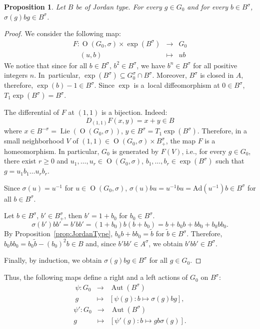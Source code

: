 \documentclass[a4paper,oneside,11pt]{amsart}
\DeclareMathOperator{\Aut}{Aut}
\DeclareMathOperator{\OO}{O}
\DeclareMathOperator{\Lie}{Lie}
\theoremstyle{plain}
\newtheorem{prop}[teo]{Proposition}
\theoremstyle{definition}
\theoremstyle{remark}
\begin{document}
\begin{prop}\label{prop:JordanType+}
Let $B$ be of Jordan type. For every $g\in G_0$ and for every $b\in B^{\sigma}$, $\sigma(g)bg\in B^{\sigma}$.
\end{prop}

\begin{proof}
We consider the following map:
$$\begin{array}{rcl}
F\colon \OO(G_0,\sigma)\times \exp(B^{\sigma}) & \to & G_0\\
\quad (u,b) & \mapsto & ub
\end{array} $$
We notice that since for all $b\in B^{\sigma}$, $b^2\in B^{\sigma}$, we have $b^n\in B^{\sigma}$ for all positive integers $n$. In~particular, $\exp(B^\sigma)\subseteq G^\sigma_0\cap B^\sigma$. Moreover, $B^{\sigma}$ is closed in $A$, therefore, $\exp(b)-1\in B^{\sigma}$. Since $\exp$ is a~local diffeomorphism at $0\in B^{\sigma}$, $T_1\exp(B^{\sigma})= B^{\sigma}$.

The differential of $F$ at $(1,1)$ is a bijection. Indeed:
$$D_{(1,1)}F(x,y)=x+y\in B$$
where $x\in B^{-\sigma}=\Lie(\OO(G_0,\sigma))$, $y\in B^{\sigma}=T_1\exp(B^{\sigma})$.
Therefore, in a small neighborhood $V$ of $(1,1)\in \OO(G_0,\sigma)\times B^{\sigma}_+$, the map $F$ is a homeomorphism. In particular, $G_0$ is generated by $F(V)$, i.e., for every $g\in G_0$, there exist $r\geq 0$ and $u_1,\dots,u_r\in \OO(G_0,\sigma)$, $b_1,\dots,b_r\in \exp(B^{\sigma})$ such that $g=u_1b_1\dots u_rb_r$.

Since $\sigma(u)=u^{-1}$ for $u\in \OO(G_0,\sigma)$, $\sigma(u)bu=u^{-1}bu=\mathrm{Ad}(u^{-1})b\in B^{\sigma}$ for all $b\in B^{\sigma}$.

Let $b\in B^{\sigma}$, $b'\in B^{\sigma}_+$, then $b'=1+b_0$ for $b_0\in B^{\sigma}$. $$\sigma(b')bb'=b'bb'=(1+b_0)b(b+b_0)=b+b_0b+bb_0+b_0bb_0.$$
By Proposition~\ref{prop:JordanType}, $b_0b+bb_0=\tilde b$ for $\tilde b\in B^{\sigma}$. Therefore, $b_0bb_0=b_0\tilde b-(b_0)^2b\in B$ and, since $b'bb'\in A^{\sigma}$, we obtain $b'bb'\in B^{\sigma}$.

Finally, by induction, we obtain $\sigma(g)bg\in B^{\sigma}$ for all $g\in G_0$.
\end{proof}

 Thus, the following maps define a right and a left actions of $G_0$ on $B^\sigma$:
$$\begin{array}{rcl}
\psi\colon  G_0 & \to & \Aut(B^{\sigma})\\
 g & \mapsto & [\psi(g)\colon b\mapsto\sigma(g)bg],
\end{array}$$
$$\begin{array}{rcl}
\psi'\colon  G_0 & \to & \Aut(B^{\sigma})\\
 g & \mapsto & [\psi'(g)\colon b\mapsto gb\sigma(g)].
\end{array}$$
\end{document}
